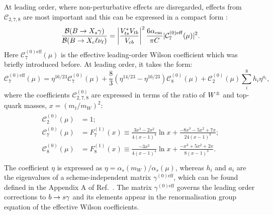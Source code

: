 At leading order, where non-perturbative effects are disregarded, effects from $\mathcal{C}_{2,7,8}$ are most important and this can be expressed in a compact form \cite{Buras:1993xp}:
\begin{equation}\label{eq:total_decay_rate_leading_order}
    \frac{\mathcal{B}(\BtoXsgamma)}{\mathcal{B}(\B\to X_c\ell\nu_\ell)} = \left|\frac{V_{ts}^*V_{tb}}{V_{cb}}\right|^2\frac{6\alpha_{\mathrm{em}}}{\pi C}|\mathcal{C}_{7}^{(0)\mathrm{eff}}(\mu)|^2.
\end{equation}
Here $\mathcal{C}_{7}^{(0)\mathrm{eff}}(\mu)$ is the effective leading-order Wilson coefficient which was briefly introduced before.
At leading order, it takes the form:
\begin{equation}\label{eq:effective_c7}
    \mathcal{C}_{7}^{(0)\mathrm{eff}}(\mu) = \eta^{16/23}\mathcal{C}^{(0)}_7(\mu) + \frac{8}{3} \left(\eta^{14/23}-\eta^{16/23}\right)\mathcal{C}^{(0)}_8(\mu) + \mathcal{C}^{(0)}_2(\mu) \sum_i^8h_i\eta^{a_i},
\end{equation}
where the \SM coefficients $\mathcal{C}_{2,7,8}^{(0)}$ are expressed in terms of the ratio of $W^\pm$ and top-quark masses, $x=(m_t/m_W)^2$:
\begin{align}\label{eq:leading_order_wilson_coeffs}
    \begin{split}
        \mathcal{C}_2^{(0)}(\mu) &= 1;\\
        \mathcal{C}_7^{(0)}(\mu) &= F_7^{(1)}(x) \equiv \frac{3x^3-2x^2}{4(x-1)^4}\ln x + \frac{-8x^3-5x^2+7x}{24(x-1)^3};\\
        \mathcal{C}_8^{(0)}(\mu) &= F_8^{(1)}(x) \equiv \frac{-3x^2}{4(x-1)^4}\ln x + \frac{-x^3+5x^2+2x}{8(x-1)^3}.\\
    \end{split}
\end{align}
The coefficient $\eta$ is expressed as $\eta=\alpha_s(m_W)/\alpha_s(\mu)$, whereas $h_i$ and $a_i$ are the eigenvalues of a scheme-independent matrix $\gamma^{(0)\mathrm{eff}}$, 
which can be found defined in the Appendix A of Ref.~\cite{Buras:1993xp}.
The matrix $\gamma^{(0)\mathrm{eff}}$ governs the leading order \QCD corrections to $b\rightarrow s\gamma$ and its elements appear in the renormalisation group equation of the effective Wilson coefficients.

